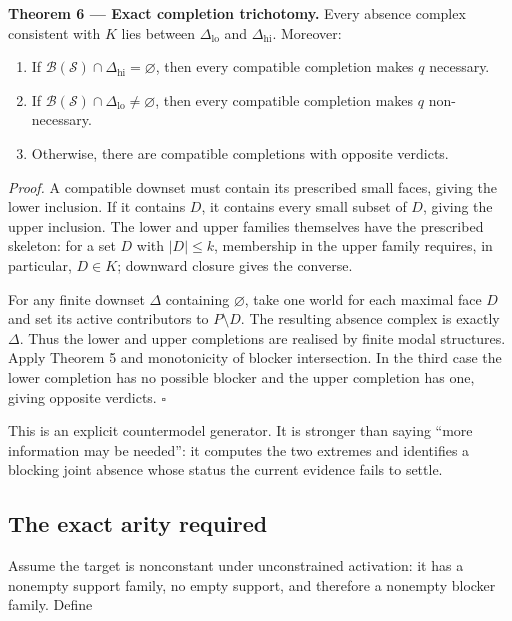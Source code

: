\documentclass[11pt,a4paper]{article}
\providecommand{\tightlist}{\setlength{\itemsep}{0pt}\setlength{\parskip}{0pt}}
\begin{document}

\textbf{Theorem 6 --- Exact completion trichotomy.} Every absence
complex consistent with \(K\) lies between \(\Delta_{\mathrm{lo}}\) and
\(\Delta_{\mathrm{hi}}\). Moreover:

\begin{enumerate}
\def\labelenumi{\arabic{enumi}.}
\tightlist
\item
  If \(\mathscr B(\mathscr S)\cap\Delta_{\mathrm{hi}}=\varnothing\),
  then every compatible completion makes \(q\) necessary.
\item
  If \(\mathscr B(\mathscr S)\cap\Delta_{\mathrm{lo}}\ne\varnothing\),
  then every compatible completion makes \(q\) non-necessary.
\item
  Otherwise, there are compatible completions with opposite verdicts.
\end{enumerate}

\emph{Proof.} A compatible downset must contain its prescribed small
faces, giving the lower inclusion. If it contains \(D\), it contains
every small subset of \(D\), giving the upper inclusion. The lower and
upper families themselves have the prescribed skeleton: for a set \(D\)
with \(|D|\le k\), membership in the upper family requires, in
particular, \(D\in K\); downward closure gives the converse.

For any finite downset \(\Delta\) containing \(\varnothing\), take one
world for each maximal face \(D\) and set its active contributors to
\(P\setminus D\). The resulting absence complex is exactly \(\Delta\).
Thus the lower and upper completions are realised by finite modal
structures. Apply Theorem 5 and monotonicity of blocker intersection. In
the third case the lower completion has no possible blocker and the
upper completion has one, giving opposite verdicts. \(\square\)

This is an explicit countermodel generator. It is stronger than saying
``more information may be needed'': it computes the two extremes and
identifies a blocking joint absence whose status the current evidence
fails to settle.

\subsection{The exact arity required}\label{the-exact-arity-required}

Assume the target is nonconstant under unconstrained activation: it has
a nonempty support family, no empty support, and therefore a nonempty
blocker family. Define
\end{document}
